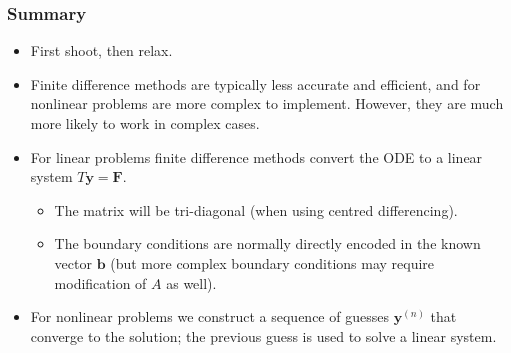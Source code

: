 \documentclass{beamer}
\newcommand{\bb}{{\boldsymbol{b}}}
\newcommand{\by}{{\boldsymbol{y}}}
\newcommand{\bfm}[1]{{\boldsymbol{#1}}}
\begin{document}
\begin{frame}
  \frametitle{Summary}

  \begin{itemize}
  \item First shoot, then relax.
  \item Finite difference methods are typically less accurate and
    efficient, and for nonlinear problems are more complex to
    implement. However, they are much more likely to work in complex
    cases.
  \item For linear problems finite difference methods convert the ODE
    to a linear system $T \by = \bfm{F}$.
    \begin{itemize}
    \item The matrix will be tri-diagonal (when using centred
      differencing).
    \item The boundary conditions are normally directly encoded in the
      known vector $\bb$ (but more complex boundary conditions may
      require modification of $A$ as well).
    \end{itemize}
  \item For nonlinear problems we construct a sequence of guesses
    $\by^{(n)}$ that converge to the solution; the previous guess is
    used to solve a linear system.
  \end{itemize}

\end{frame}
\end{document}

